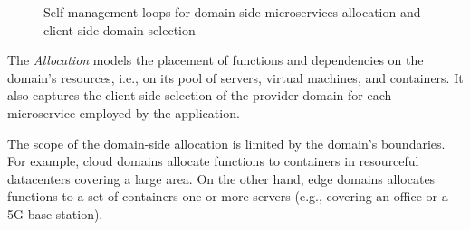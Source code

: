 \begin{figure}[thbp]
	\centering
	\captionsetup[subfigure]{width=0.4\textwidth}	
	\null\hfill
	\captionsetup[subfigure]{width=0.4\textwidth}	
	\hfill
	\hfill\null
	\caption{Self-management loops for domain-side microservices allocation and client-side domain selection}\label{fig:allocation-loops}
\end{figure}

The \textit{Allocation} models the placement of functions and dependencies on the domain's resources, i.e., on its pool of servers, virtual machines, and containers. It also captures the client-side selection of the provider domain for each microservice employed by the application.


The scope of the domain-side allocation is limited by the domain's boundaries. For example, cloud domains allocate functions to containers in resourceful datacenters covering a large area. On the other hand, edge domains allocates functions to a set of containers one or more servers (e.g., covering an office or a 5G base station). 

